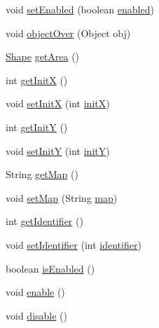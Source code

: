 \begin{DoxyCompactItemize}
void \mbox{\hyperlink{classdetectors_1_1_map_changer_ae99885d28c5978a4dcbc0e1c484eb7a0}{set\+Enabled}} (boolean \mbox{\hyperlink{classdetectors_1_1_map_changer_a603d3a106676167a607d9acd5176f8f8}{enabled}})
\item 
void \mbox{\hyperlink{classdetectors_1_1_map_changer_a4803cdf3ccad2502423706f266869a72}{object\+Over}} (Object obj)
\item 
\mbox{\hyperlink{classorg_1_1newdawn_1_1slick_1_1geom_1_1_shape}{Shape}} \mbox{\hyperlink{classdetectors_1_1_map_changer_a6aa16432a59706e55237c61cde2e3336}{get\+Area}} ()
\item 
int \mbox{\hyperlink{classdetectors_1_1_map_changer_a4d7a3d7511cffb43d1bcf866927a7c12}{get\+InitX}} ()
\item 
void \mbox{\hyperlink{classdetectors_1_1_map_changer_a96d45124191401322f3f9bfc76b3830f}{set\+InitX}} (int \mbox{\hyperlink{classdetectors_1_1_map_changer_a45c8356dc930a1289333a55a1a13a606}{initX}})
\item 
int \mbox{\hyperlink{classdetectors_1_1_map_changer_acb4c06fa4e179d3b8465e80932ed2310}{get\+InitY}} ()
\item 
void \mbox{\hyperlink{classdetectors_1_1_map_changer_a5b0f5e7cd4c82d221683bc224e5ab14a}{set\+InitY}} (int \mbox{\hyperlink{classdetectors_1_1_map_changer_a893e5aefb0e75665409f73b6e1542b59}{initY}})
\item 
String \mbox{\hyperlink{classdetectors_1_1_map_changer_a9751921504c31dd83363b128431b6633}{get\+Map}} ()
\item 
void \mbox{\hyperlink{classdetectors_1_1_map_changer_ae894dd5e58b9f82acefbfc85a928ecb6}{set\+Map}} (String \mbox{\hyperlink{classdetectors_1_1_map_changer_ad642fa774f24afd2651f54d430608092}{map}})
\item 
int \mbox{\hyperlink{classdetectors_1_1_map_changer_af5ecc9f5fa80c769ace0b1e623d9f431}{get\+Identifier}} ()
\item 
void \mbox{\hyperlink{classdetectors_1_1_map_changer_ae812ca1f161dd4e001b87b3a7961fb17}{set\+Identifier}} (int \mbox{\hyperlink{classdetectors_1_1_map_changer_a4c880379dc5b9cdd0c11d388ed7d28ca}{identifier}})
\item 
boolean \mbox{\hyperlink{classdetectors_1_1_map_changer_afea07edc6a03aef261b674c21dd9c50e}{is\+Enabled}} ()
\item 
void \mbox{\hyperlink{classdetectors_1_1_map_changer_ac62f6efb8dbbbf91ca21b3789de4f755}{enable}} ()
\item 
void \mbox{\hyperlink{classdetectors_1_1_map_changer_abc1c02ba44ab3c41c5281d4eb18eab63}{disable}} ()
\end{DoxyCompactItemize}
